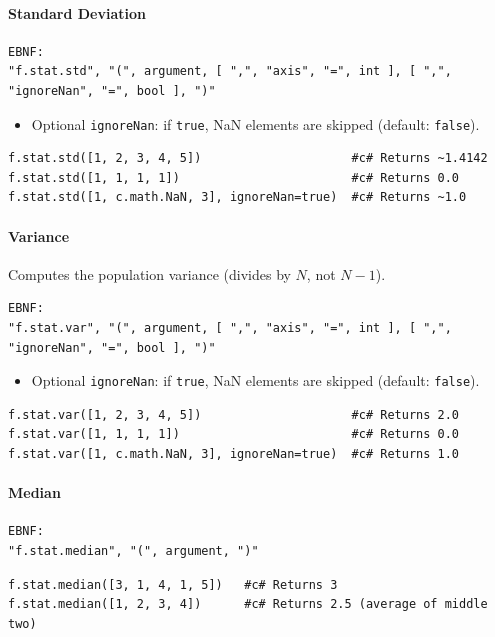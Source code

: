 \paragraph{Standard Deviation}
\begin{verbatim}
EBNF:
"f.stat.std", "(", argument, [ ",", "axis", "=", int ], [ ",", "ignoreNan", "=", bool ], ")"
\end{verbatim}
\begin{itemize}
\item Optional \texttt{ignoreNan}: if \texttt{true}, NaN elements are skipped (default: \texttt{false}).
\end{itemize}
\begin{verbatim}
f.stat.std([1, 2, 3, 4, 5])                     #c# Returns ~1.4142
f.stat.std([1, 1, 1, 1])                        #c# Returns 0.0
f.stat.std([1, c.math.NaN, 3], ignoreNan=true)  #c# Returns ~1.0
\end{verbatim}

\paragraph{Variance}
Computes the population variance (divides by $N$, not $N-1$).
\begin{verbatim}
EBNF:
"f.stat.var", "(", argument, [ ",", "axis", "=", int ], [ ",", "ignoreNan", "=", bool ], ")"
\end{verbatim}
\begin{itemize}
\item Optional \texttt{ignoreNan}: if \texttt{true}, NaN elements are skipped (default: \texttt{false}).
\end{itemize}
\begin{verbatim}
f.stat.var([1, 2, 3, 4, 5])                     #c# Returns 2.0
f.stat.var([1, 1, 1, 1])                        #c# Returns 0.0
f.stat.var([1, c.math.NaN, 3], ignoreNan=true)  #c# Returns 1.0
\end{verbatim}

\paragraph{Median}
\begin{verbatim}
EBNF:
"f.stat.median", "(", argument, ")"
\end{verbatim}
\begin{verbatim}
f.stat.median([3, 1, 4, 1, 5])   #c# Returns 3
f.stat.median([1, 2, 3, 4])      #c# Returns 2.5 (average of middle two)
\end{verbatim}

